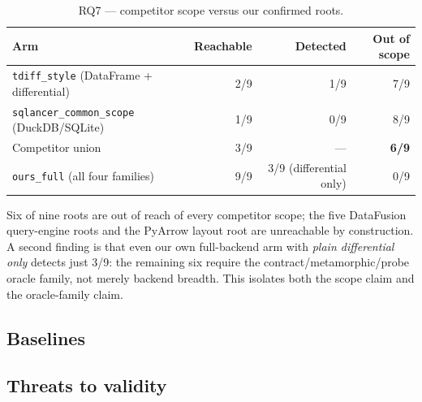 \begin{table}[t]
\caption{RQ7 — competitor scope versus our confirmed roots.}
\label{tab:rq7}
\small
\begin{tabular}{@{}lrrr@{}}
\toprule
Arm & Reachable & Detected & Out of scope \\
\midrule
\texttt{tdiff\_style} (DataFrame + differential) & 2/9 & 1/9 & 7/9 \\
\texttt{sqlancer\_common\_scope} (DuckDB/SQLite) & 1/9 & 0/9 & 8/9 \\
Competitor union & 3/9 & --- & \textbf{6/9} \\
\texttt{ours\_full} (all four families) & 9/9 & 3/9 (differential only) & 0/9 \\
\bottomrule
\end{tabular}
\end{table}

Six of nine roots are out of reach of every competitor scope; the five DataFusion query-engine
roots and the PyArrow layout root are unreachable by construction. A second finding is that
even our own full-backend arm with \emph{plain differential only} detects just 3/9: the
remaining six require the contract/metamorphic/probe oracle family, not merely backend breadth.
This isolates both the scope claim and the oracle-family claim.

\subsection{Baselines}


\subsection{Threats to validity}

